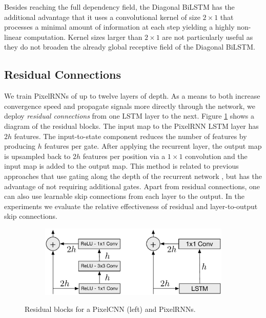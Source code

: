 Besides reaching the full dependency field, the Diagonal BiLSTM has the additional advantage that it uses a convolutional kernel of size $2\times1$ that processes a minimal amount of information at each step yielding a highly non-linear computation. Kernel sizes larger than $2\times1$ are not particularly useful as they do not broaden the already global receptive field of the Diagonal BiLSTM. 

\subsection{Residual Connections}
\label{sect:residual}

We train PixelRNNs of up to twelve layers of depth. As a means to both increase convergence speed and propagate signals more directly through the network, we deploy \emph{residual connections} \cite{DBLP:journals/corr/HeZRS15} from one LSTM layer to the next. Figure \ref{fig:residual_blocks} shows a diagram of the residual blocks. The input map to the PixelRNN LSTM layer has $2h$ features. The input-to-state component reduces the number of features by producing $h$ features per gate. After applying the recurrent layer, the output map is upsampled back to $2h$ features per position via a $1\times1 $ convolution and the input map is added to the output map. This method is related to previous approaches that use gating along the depth of the recurrent network \cite{DBLP:journals/corr/KalchbrennerDG15,zhang2016highway}, but has the advantage of not requiring additional gates. Apart from residual connections, one can also use learnable skip connections from each layer to the output. In the experiments we evaluate the relative effectiveness of residual and layer-to-output skip connections. 
	
\begin{figure}[ht]
\centering
\begin{subfigure}{.4\textwidth}
  \centering
  \includegraphics[width=\linewidth]{residuals2.pdf}
\end{subfigure}%
\caption{Residual blocks for a PixelCNN (left) and PixelRNNs.}
\label{fig:residual_blocks}
\vspace{-0.2cm}
\end{figure}

